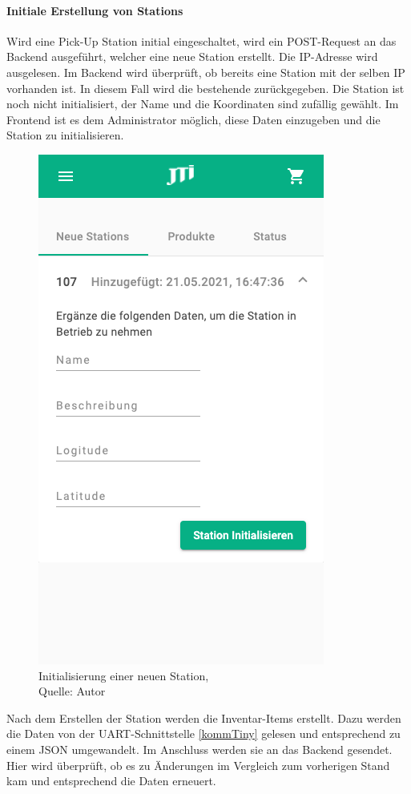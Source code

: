 \paragraph{Initiale Erstellung von Stations}
Wird eine Pick-Up Station initial eingeschaltet, wird ein POST-Request an das Backend ausgeführt, welcher eine neue Station erstellt. Die \ac{IP}-Adresse wird ausgelesen. Im Backend wird überprüft, ob bereits eine Station mit der selben \ac{IP} vorhanden ist. In diesem Fall wird die bestehende zurückgegeben. Die Station ist noch nicht initialisiert, der Name und die Koordinaten sind zufällig gewählt. Im Frontend ist es dem Administrator möglich, diese Daten einzugeben und die Station zu initialisieren. 
 \begin{figure}[H]
	\centering
	\includegraphics[scale=0.3]{images/initStation.PNG}
	\caption[Initialisierung einer neuen Station]{Initialisierung einer neuen Station,\\ Quelle: Autor}
	\label{img: initStation}
\end{figure} 
Nach dem Erstellen der Station werden die Inventar-Items erstellt. Dazu werden die Daten von der \ac{UART}-Schnittstelle \ref{kommTiny} gelesen und entsprechend zu einem \ac{JSON} umgewandelt. Im Anschluss werden sie an das Backend gesendet. Hier wird überprüft, ob es zu Änderungen im Vergleich zum vorherigen Stand kam und entsprechend die Daten erneuert. 

